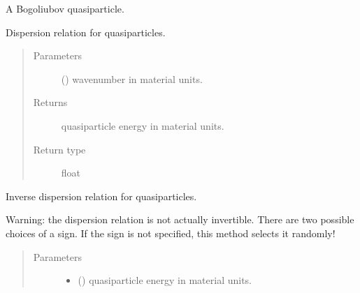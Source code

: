 \documentclass[letterpaper,10pt,english]{sphinxmanual}
\begin{document}

\begin{fulllineitems}
\label{\detokenize{code_structure:scdc.particle.Quasiparticle}}
A Bogoliubov quasiparticle.

\begin{fulllineitems}
\label{\detokenize{code_structure:scdc.particle.Quasiparticle.dispersion}}
Dispersion relation for quasiparticles.
\begin{quote}\begin{description}
\item[{Parameters}] \leavevmode
{} () \textendash{} wavenumber in material units.

\item[{Returns}] \leavevmode
quasiparticle energy in material units.

\item[{Return type}] \leavevmode
float

\end{description}\end{quote}

\end{fulllineitems}


\begin{fulllineitems}
\label{\detokenize{code_structure:scdc.particle.Quasiparticle.dispersion_inverse}}
Inverse dispersion relation for quasiparticles.

Warning: the dispersion relation is not actually invertible. There are
two possible choices of a sign. If the sign  is not specified, this
method selects it randomly!
\begin{quote}\begin{description}
\item[{Parameters}] \leavevmode\begin{itemize}
\item {} 
 () \textendash{} quasiparticle energy in material units.


\end{itemize}
\end{description}
\end{quote}
\end{fulllineitems}
\end{fulllineitems}
\end{document}
